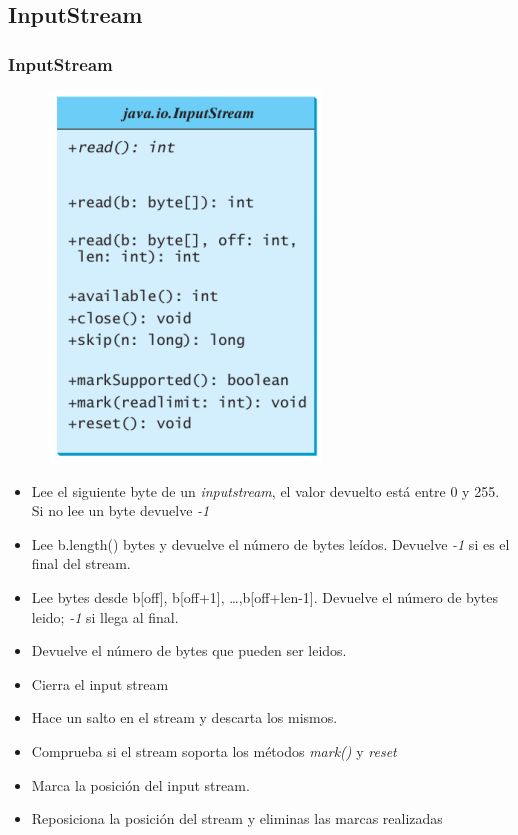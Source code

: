 \documentclass{beamer}
\begin{document}
\subsection{InputStream}
\begin{frame}
\frametitle{InputStream} 
\begin{multicols}{2}
\begin{figure}
\includegraphics[scale=0.5]{imagenes/input.png} 
\end{figure} 
\begin{footnotesize}
\begin{itemize}[<+->]
\item Lee el siguiente byte de un \emph{inputstream}, el valor devuelto está entre 0 y 255. Si no lee un byte devuelve \emph{-1}
\item Lee b.length() bytes y devuelve el número de bytes leídos. Devuelve \emph{-1} si es el final del stream.
\item Lee bytes desde b[off], b[off+1], \dots ,b[off+len-1]. Devuelve el número de bytes leido; \emph{-1} si llega al final.
\item Devuelve el número de bytes que pueden ser leidos.
\item Cierra el input stream
\item Hace un salto en el stream y descarta los mismos.
\item Comprueba si el stream soporta los métodos \emph{mark()} y \emph{reset}
\item Marca la posición del input stream.
\item Reposiciona la posición del stream y eliminas las marcas realizadas 
\end{itemize}
\end{footnotesize}
\end{multicols}
\end{frame}
\end{document}
